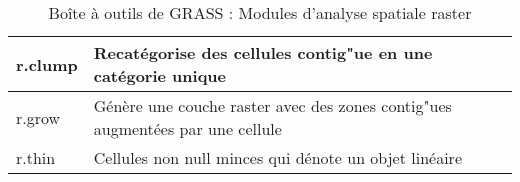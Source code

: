 \begin{table}[H]
\begin{tabular}{|p{4cm}|p{10cm}|}
  \hline r.clump & Recatégorise des cellules contig"ue en une catégorie unique \\
  \hline r.grow & Génère une couche raster avec des zones contig"ues augmentées par une cellule\\
  \hline r.thin & Cellules non null minces qui dénote un objet linéaire \\
\hline
\end{tabular}
\caption{Boîte à outils de GRASS : Modules d'analyse spatiale raster}
\end{table}

